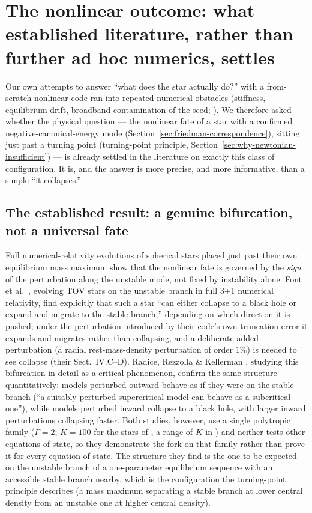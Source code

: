 \documentclass[11pt]{article}
\begin{document}
\section{The nonlinear outcome: what established literature, rather than further ad hoc numerics, settles}
\label{sec:nonlinear-outcome}

Our own attempts to answer ``what does the star actually do?'' with a from-scratch nonlinear code ran into repeated numerical obstacles (stiffness, equilibrium drift, broadband contamination of the seed; \citealt{OwnbyPhase2}). We therefore asked whether the physical question --- the nonlinear fate of a star with a confirmed negative-canonical-energy mode (Section~\ref{sec:friedman-correspondence}), sitting just past a turning point (turning-point principle, Section~\ref{sec:why-newtonian-insufficient}) --- is already settled in the literature on exactly this class of configuration. It is, and the answer is more precise, and more informative, than a simple ``it collapses.''

\subsection{The established result: a genuine bifurcation, not a universal fate}
\label{sec:bifurcation}

Full numerical-relativity evolutions of spherical stars placed just past their own equilibrium mass maximum show that the nonlinear fate is governed by the \emph{sign} of the perturbation along the unstable mode, not fixed by instability alone. Font et al.\ \citep{FontEtAl2002}, evolving TOV stars on the unstable branch in full 3+1 numerical relativity, find explicitly that such a star ``can either collapse to a black hole or expand and migrate to the stable branch,'' depending on which direction it is pushed; under the perturbation introduced by their code's own truncation error it expands and migrates rather than collapsing, and a deliberate added perturbation (a radial rest-mass-density perturbation of order $1\%$) is needed to see collapse (their Sect.~IV.C--D). Radice, Rezzolla \& Kellerman \citep{RadiceRezzollaKellermann2010}, studying this bifurcation in detail as a critical phenomenon, confirm the same structure quantitatively: models perturbed outward behave as if they were on the stable branch (``a suitably perturbed supercritical model can behave as a subcritical one''), while models perturbed inward collapse to a black hole, with larger inward perturbations collapsing faster. Both studies, however, use a single polytropic family ($\Gamma=2$; $K=100$ for the stars of \citealt{FontEtAl2002}, a range of $K$ in \citealt{RadiceRezzollaKellermann2010}) and neither tests other equations of state, so they demonstrate the fork on that family rather than prove it for every equation of state. The structure they find is the one to be expected on the unstable branch of a one-parameter equilibrium sequence with an accessible stable branch nearby, which is the configuration the turning-point principle describes (a mass maximum separating a stable branch at lower central density from an unstable one at higher central density).
\end{document}
